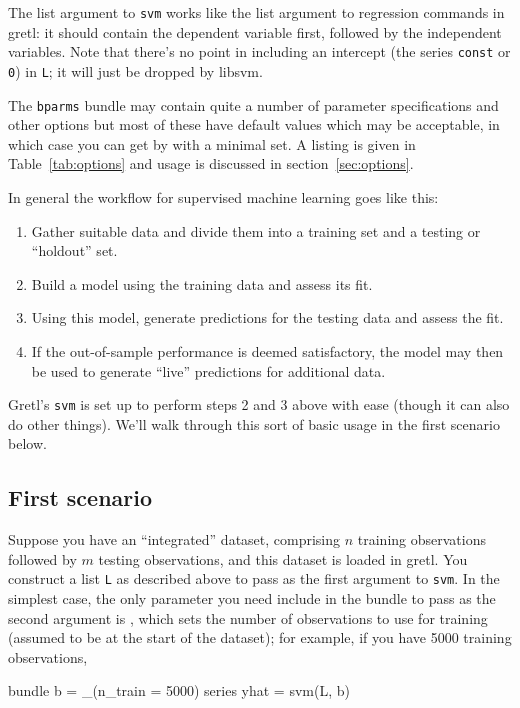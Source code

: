 \documentclass{article}
\begin{document}
The list argument to \texttt{svm} works like the list argument to
regression commands in gretl: it should contain the dependent variable
first, followed by the independent variables. Note that there's no
point in including an intercept (the series \texttt{const} or
\texttt{0}) in \texttt{L}; it will just be dropped by \textsf{libsvm}.

The \texttt{bparms} bundle may contain quite a number of parameter
specifications and other options but most of these have default
values which may be acceptable, in which case you can get by with a
minimal set.  A listing is given in Table~\ref{tab:options} and usage
is discussed in section~\ref{sec:options}.

In general the workflow for supervised machine learning goes like this:
\begin{enumerate}
\item Gather suitable data and divide them into a training set and a
  testing or ``holdout'' set.
\item Build a model using the training data and assess its fit.
\item Using this model, generate predictions for the testing data and
  assess the fit.
\item If the out-of-sample performance is deemed satisfactory, the model
  may then be used to generate ``live'' predictions for additional data.
\end{enumerate}

Gretl's \texttt{svm} is set up to perform steps 2 and 3 above with
ease (though it can also do other things). We'll walk through this
sort of basic usage in the first scenario below.

\subsection{First scenario}
\label{sec:s1}

Suppose you have an ``integrated'' dataset, comprising $n$ training
observations followed by $m$ testing observations, and this dataset is
loaded in gretl. You construct a list \texttt{L} as described above to
pass as the first argument to \texttt{svm}. In the simplest case, the
only parameter you need include in the bundle to pass as the second
argument is , which sets the number of observations
to use for training (assumed to be at the start of the dataset); for
example, if you have 5000 training observations,
\begin{code}
bundle b = _(n_train = 5000)
series yhat = svm(L, b)
\end{code}
\end{document}
